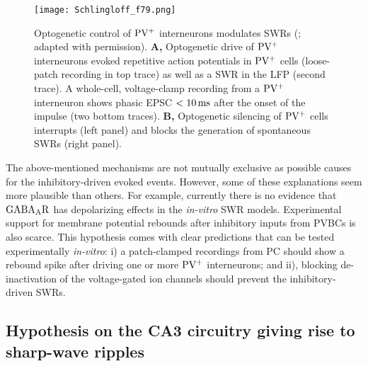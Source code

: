     \begin{figure}
      \center
      \texttt{[image: Schlingloff\_f79.png]}
      \caption{
        Optogenetic control of $\rm PV^+$ interneurons modulates SWRs
        (\citealp{Schlingloff2014}; adapted with permission).
        {\bf A,} Optogenetic drive of $\rm PV^+$ interneurons evoked repetitive action
        potentials in $\rm PV^+$ cells (loose-patch recording in top trace) as well as a
        SWR in the LFP (second trace). A whole-cell, voltage-clamp recording 
        from a $\rm PV^+$ interneuron shows phasic EPSC $<10 \, \rm ms$
        after the onset of the impulse (two bottom traces).
        \textbf{B,} Optogenetic silencing of $\rm PV^+$ cells interrupts (left
        panel) and blocks the generation of spontaneous SWRs (right panel).
             }
    \label{fig:Schlingloff79}
    \end{figure}

    The above-mentioned mechanisms are not mutually exclusive as possible
    causes for the inhibitory-driven evoked events. However, some of these
    explanations seem more plausible than others. For example, currently there
    is no evidence that $\rm GABA_AR$ has depolarizing effects in the
    \textit{in-vitro} SWR models. Experimental support for membrane potential
    rebounds after inhibitory inputs from PVBCs is also scarce. This hypothesis
    comes with clear predictions that can be tested experimentally
    \textit{in-vitro}: i) a patch-clamped recordings from PC should show a
    rebound spike after driving one or more $\rm PV^+$ interneurons; and ii),
    blocking de-inactivation of the voltage-gated ion channels should prevent
    the inhibitory-driven SWRs. 
    
  \subsection{Hypothesis on the CA3 circuitry giving rise to sharp-wave ripples}
  \label{sec:3pop}

  \begin{comment}
    In the previous chapter I have proposed a computational model for the emergence
    of SWs and the associated replay of sequences. However, such a model
    consisting of 2 populations (excitatory and inhibitory) is a crude
    approximation of the CA3 hippocampal network, where over 20 different types
    of neurons have been reported \citep{Maccaferri2003, Klausberger2008}. In
    this section I present a phenomenological model of a minimal hypothetical
    CA3 circuit consisting of 3 populations (excitatory and 2 inhibitory) that
    gives rise to the SWR events observed in slices. The hypothesis presented
    below aims to explain some paradoxical results reported in the literature.
    The proposed model relies on a number of assumptions that are to be tested
    in experiments. Moreover, it comes with some predictions that can validate
    or invalidate the proposed model.
  \end{comment}

